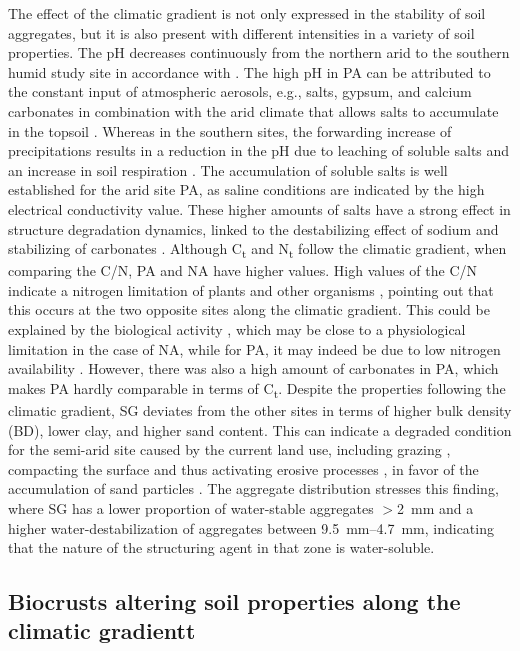 The effect of the climatic gradient is not only expressed in the stability of soil aggregates, but it is also present with different intensities in a variety of soil properties. The pH decreases continuously from the northern arid to the southern humid study site in accordance with \citet{Bernhard2018}. The high pH in PA can be attributed to the constant input of atmospheric aerosols, e.g., salts, gypsum, and calcium carbonates \citep{Ewing2006} in combination with the arid climate that allows salts to accumulate in the topsoil \citep{Slessarev2016}. Whereas in the southern sites, the forwarding increase of precipitations results in a reduction in the pH due to leaching of soluble salts \citep{Slessarev2016} and an increase in soil respiration \citep{Orchard1983}. The accumulation of soluble salts is well established for the arid site PA, as saline conditions \citep{Allison1954} are indicated by the high electrical conductivity value. These higher amounts of salts have a strong effect in structure degradation dynamics, linked to the destabilizing effect of sodium and stabilizing of carbonates \citep{Corwin2021}. Although C\textsubscript{t} and N\textsubscript{t} follow the climatic gradient, when comparing the C/N, PA and NA have higher values. High values of the C/N indicate a nitrogen limitation of plants and other organisms \citep{Brust2019}, pointing out that this occurs at the two opposite sites along the climatic gradient. This could be explained by the biological activity \citep{Zhang2013}, which may be close to a physiological limitation in the case of NA, while for PA, it may indeed be due to low nitrogen availability \citep{Hooper1999}. However, there was also a high amount of carbonates in PA, which makes PA hardly comparable in terms of C\textsubscript{t}. Despite the properties following the climatic gradient, SG deviates from the other sites in terms of higher bulk density (BD), lower clay, and higher sand content. This can indicate a degraded condition for the semi-arid site caused by the current land use, including grazing \citep{Armesto2007}, compacting the surface and thus activating erosive processes \citep{Scholten2019}, in favor of the accumulation of sand particles \citep{Govers1985}. The aggregate distribution stresses this finding, where SG has a lower proportion of water-stable aggregates $>$\SI{2}{\milli\meter} and a higher water-destabilization of aggregates between \SIrange{9.5}{4.7}{\milli\meter}, indicating that the nature of the structuring agent in that zone is water-soluble.


\subsection{Biocrusts altering soil properties along the climatic gradientt}

